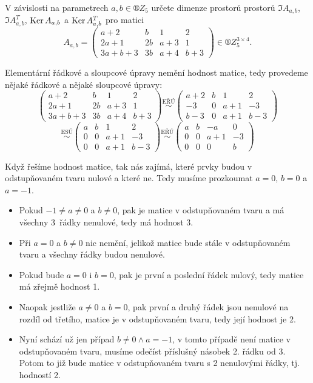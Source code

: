 \documentclass[12pt]{article}					%
\begin{document}
    \begin{priklad}[9.1]
        V závislosti na parametrech $a, b \in ®Z_5$ určete dimenze prostorů prostorů $\Im A_{a, b}$, $\Im A^T_{a, b}$, $\operatorname{Ker} A_{a, b}$ a $\operatorname{Ker} A^T_{a, b}$ pro matici
        $$ A_{a, b} = \begin{pmatrix} a+2 & b & 1 & 2 \\ 2a+1 & 2b & a+3 & 1 \\ 3a+b+3 & 3b & a+4 & b+3 \end{pmatrix} \in ®Z^{3 \times 4}_5. $$ 

        \begin{reseni}
            Elementární řádkové a sloupcové úpravy nemění hodnost matice, tedy provedeme nějaké řádkové a nějaké sloupcové úpravy:
            $$ \begin{pmatrix} a+2 & b & 1 & 2 \\ 2a+1 & 2b & a+3 & 1 \\ 3a+b+3 & 3b & a+4 & b+3 \end{pmatrix} \overset{\text{EŘÚ}}{\sim} \begin{pmatrix} a+2 & b & 1 & 2 \\ -3 & 0 & a+1 & -3 \\ b-3 & 0 & a+1 & b-3 \end{pmatrix} $$
            $$ \overset{\text{ESÚ}}{\sim} \begin{pmatrix} a & b & 1 & 2 \\ 0 & 0 & a+1 & -3 \\ 0 & 0 & a+1 & b-3 \end{pmatrix} \overset{\text{EŘÚ}}{\sim} \begin{pmatrix} a & b & -a & 0 \\ 0 & 0 & a+1 & -3 \\ 0 & 0 & 0 & b \end{pmatrix} $$

            Když řešíme hodnost matice, tak nás zajímá, které prvky budou v odstupňovaném tvaru nulové a které ne. Tedy musíme prozkoumat $a = 0$, $b = 0$ a $a = -1$.
            \begin{itemize}
                \item Pokud $-1≠a≠0$ a $b≠0$, pak je matice v odstupňovaném tvaru a má všechny 3~řádky nenulové, tedy má hodnost 3.
                \item Při $a=0$ a $b ≠ 0$ nic nemění, jelikož matice bude stále v odstupňovaném tvaru a všechny řádky budou nenulové.
                \item Pokud bude $a=0$ i $b = 0$, pak je první a poslední řádek nulový, tedy matice má zřejmě hodnost 1.
                \item Naopak jestliže $a≠0$ a $b=0$, pak první a druhý řádek jsou nenulové na rozdíl od třetího, matice je v odstupňovaném tvaru, tedy její hodnost je 2.
                \item Nyní schází už jen případ $b≠0 \land a = -1$, v tomto případě není matice v odstupňovaném tvaru, musíme odečíst příslušný násobek 2. řádku od 3. Potom to již bude matice v odstupňovaném tvaru s 2 nenulovými řádky, tj. hodností 2.
            \end{itemize}


\end{reseni}
\end{priklad}
\end{document}
